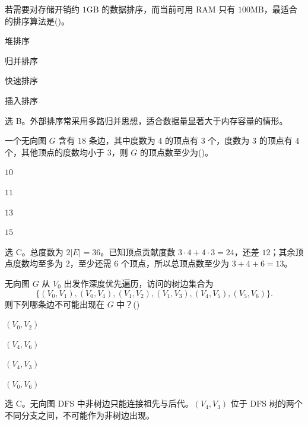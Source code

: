 \begin{question}
若需要对存储开销约 $1\mathrm{GB}$ 的数据排序，而当前可用 RAM 只有 $100\mathrm{MB}$，最适合的排序算法是(\quad)。
\begin{choiceoptions}[2]
  \item 堆排序
  \item 归并排序
  \item 快速排序
  \item 插入排序
\end{choiceoptions}
\begin{solution}
选 B。外部排序常采用多路归并思想，适合数据量显著大于内存容量的情形。
\end{solution}
\end{question}

\begin{question}
一个无向图 $G$ 含有 $18$ 条边，其中度数为 $4$ 的顶点有 $3$ 个，度数为 $3$ 的顶点有 $4$ 个，其他顶点的度数均小于 $3$，则 $G$ 的顶点数至少为(\quad)。
\begin{choiceoptions}[1]
  \item $10$
  \item $11$
  \item $13$
  \item $15$
\end{choiceoptions}
\begin{solution}
选 C。总度数为 $2|E|=36$。已知顶点贡献度数 $3\cdot4+4\cdot3=24$，还差 $12$；其余顶点度数均至多为 $2$，至少还需 $6$ 个顶点，所以总顶点数至少为 $3+4+6=13$。
\end{solution}
\end{question}

\begin{question}
无向图 $G$ 从 $V_0$ 出发作深度优先遍历，访问的树边集合为
\[
\{(V_0,V_1),(V_0,V_4),(V_1,V_2),(V_1,V_3),(V_4,V_5),(V_5,V_6)\}.
\]
则下列哪条边不可能出现在 $G$ 中？(\quad)
\begin{choiceoptions}[2]
  \item $(V_0,V_2)$
  \item $(V_4,V_6)$
  \item $(V_4,V_3)$
  \item $(V_0,V_6)$
\end{choiceoptions}
\begin{solution}
选 C。无向图 DFS 中非树边只能连接祖先与后代。$(V_4,V_3)$ 位于 DFS 树的两个不同分支之间，不可能作为非树边出现。
\end{solution}
\end{question}

